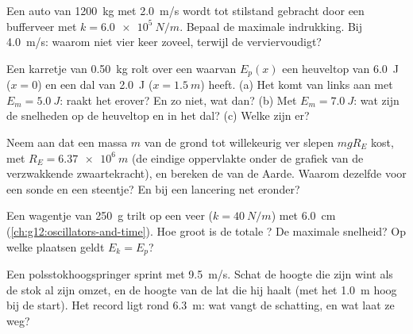 \begin{exercise}[$\star\star$]\label{exo:g12:work-and-energy:11}
Een auto van \qty{1200}{kg} met \qty{2.0}{m/s} wordt tot stilstand gebracht
door een bufferveer met  $k = \qty{6.0e5}{N/m}$. Bepaal de
maximale indrukking. Bij \qty{4.0}{m/s}: waarom niet vier keer zoveel, terwijl
de  verviervoudigt?
\end{exercise}

\begin{exercise}[$\star\star\star$]\label{exo:g12:work-and-energy:12}
Een karretje van \qty{0.50}{kg} rolt over een  waarvan $E_p(x)$ een
heuveltop van \qty{6.0}{J} ($x = 0$) en een dal van \qty{2.0}{J}
($x = \qty{1.5}{m}$) heeft. (a) Het komt van links aan met
$E_m = \qty{5.0}{J}$: raakt het erover? En zo niet, wat dan? (b) Met
$E_m = \qty{7.0}{J}$: wat zijn de snelheden op de heuveltop en in het dal?
(c) Welke  zijn er?
\end{exercise}

\begin{exercise}[$\star\star\star$]\label{exo:g12:work-and-energy:13}
Neem aan dat een massa $m$ van de grond tot willekeurig ver slepen $mgR_E$
kost, met $R_E = \qty{6.37e6}{m}$ (de eindige oppervlakte onder de grafiek van
de verzwakkende zwaartekracht), en bereken de \emph{} van
de Aarde. Waarom dezelfde voor een sonde en een steentje? En bij een lancering
net eronder?
\end{exercise}

\begin{exercise}[$\star\star\star$]\label{exo:g12:work-and-energy:14}
Een wagentje van \qty{250}{g} trilt op een veer ($k = \qty{40}{N/m}$) met
 \qty{6.0}{cm} (\cref{ch:g12:oscillators-and-time}). Hoe groot is de
totale ? De maximale snelheid? Op welke plaatsen geldt $E_k = E_p$?
\end{exercise}

\begin{exercise}[$\star\star\star$]\label{exo:g12:work-and-energy:15}
Een polsstokhoogspringer sprint met \qty{9.5}{m/s}. Schat de hoogte die zijn
 wint als de stok al zijn  omzet, en de
hoogte van de lat die hij haalt (met het  \qty{1.0}{m} hoog bij
de start). Het record ligt rond \qty{6.3}{m}: wat vangt de schatting, en wat
laat ze weg?
\end{exercise}

